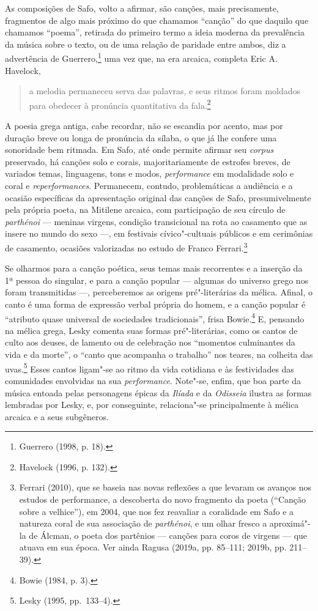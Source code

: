 As composições de Safo, volto a afirmar, são canções, mais
precisamente, fragmentos de algo mais próximo do que chamamos “canção” do que
daquilo que chamamos “poema”, retirada do primeiro termo a ideia moderna da
prevalência da música sobre o texto, ou de uma relação de paridade entre ambos,
diz a advertência de Guerrero,\footnote{ Guerrero (1998, p. 18).} uma vez que, na era arcaica,
completa Eric A. Havelock, 

\begin{quote}
a melodia permaneceu serva
das palavras, e seus ritmos foram moldados para obedecer à pronúncia
quantitativa da fala.\footnote{ Havelock (1996, p. 132).}
\end{quote}

 A poesia grega antiga, cabe recordar, não se
escandia por acento, mas por duração breve ou longa de pronúncia da sílaba, o
que já lhe confere uma sonoridade bem ritmada. Em Safo, até onde permite
afirmar seu \textit{corpus} preservado,
há canções solo e corais, majoritariamente de estrofes breves, de variados temas,
linguagens, tons e modos, \textit{performance} em modalidade solo e coral
e \textit{reperformances}. Permanecem, contudo, problemáticas a
audiência e a ocasião específicas da apresentação original das canções
de Safo, presumivelmente pela própria poeta, na Mitilene arcaica, com participação de seu círculo de \textit{parthénoi} --- meninas virgens, condição transicional na rota ao casamento que as insere no mundo do sexo ---, em festivais cívico"-cultuais públicos e em cerimônias de casamento, ocasiões valorizadas no estudo de Franco Ferrari.\footnote{Ferrari (2010), que se baseia nas novas reflexões a que levaram os avanços nos estudos de performance, a descoberta do novo fragmento da poeta (``Canção sobre a velhice''), em 2004, que nos fez reavaliar a coralidade em Safo e a natureza coral de sua associação de \textit{parthénoi}, e um olhar fresco a aproximá"-la de Álcman, o poeta dos partênios --- canções para coros de virgens --- que atuava em sua época. Ver ainda Ragusa (2019a, pp. 85--111; 2019b, pp. 211--39).}

Se olharmos para a canção poética, seus temas mais recorrentes e a inserção da
1ª pessoa do singular, e para a canção popular --- algumas do universo grego nos
foram transmitidas ---, perceberemos as origens pré"-literárias da mélica. Afinal,
o canto é uma forma de expressão verbal própria do homem, e a canção popular é
“atributo quase universal de sociedades tradicionais”, frisa Bowie.\footnote{
Bowie (1984, p. 3).} E, pensando na mélica grega, Lesky comenta suas formas
pré"-literárias, como os cantos de culto aos deuses, de lamento ou de celebração
nos “momentos culminantes da vida e da morte”, o “canto que acompanha o
trabalho” nos teares, na colheita das uvas.\footnote{ Lesky (1995, pp.~133--4).} Esses cantos ligam"-se ao ritmo da
vida cotidiana e às festividades das comunidades envolvidas na sua
\textit{performance}. Note"-se, enfim, que boa parte da música entoada pelas
personagens épicas da \textit{Ilíada} e da \textit{Odisseia} ilustra as formas
lembradas por Lesky, e, por conseguinte, relaciona"-se principalmente à mélica
arcaica e a seus subgêneros.

